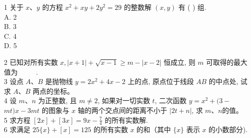 \documentclass[10pt]{article}
\begin{document}
1 关于 $x 、 y$ 的方程 $x^{2}+x y+2 y^{2}=29$ 的整数解 $(x, y)$ 有 ( ) 组.\\
A. 2\\
B. 3\\
C. 4\\
D. 5

2 已知对所有实数 $x,|x+1|+\sqrt{x-1} \geqslant m-|x-2|$ 恒成立, 则 $m$ 可取得的最大值为 $\qquad$ .\\
3 设点 $A 、 B$ 是抛物线 $y=2 x^{2}+4 x-2$ 上的点, 原点位于线段 $A B$ 的中点处, 试求 $A 、 B$ 两点的坐标。\\
4 设 $m 、 n$ 为正整数, 且 $m \neq 2$, 如果对一切实数 $t$, 二次函数 $y=x^{2}+(3-$ $m t) x-3 m t$ 的图象与 $x$ 轴的两个交点间的距离不小于 $|2 t+n|$, 求 $m 、 n$的值。\\
5 求方程 $[2 x]+[3 x]=9 x-\frac{7}{4}$ 的所有实数解.\\
6 求满足 $25\{x\}+[x]=125$ 的所有实数 $x$ 的和（其中 $\{x\}$ 表示 $x$ 的小数部分).
\end{document}
